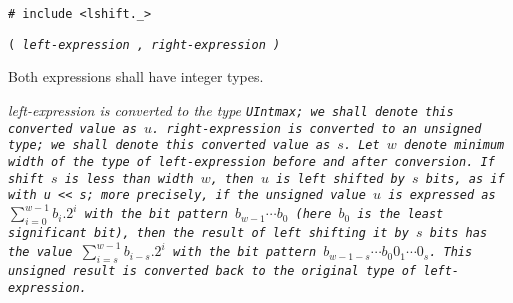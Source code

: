 
\tt{# include <lshift._>}

 \tt{(} \it{left-expression} \tt{,} \it{right-expression} \tt{)}


Both expressions shall have integer types.


\it{left-expression} is converted to the type \tt{UIntmax};
we shall denote this converted value as $u$.
\it{right-expression} is converted to an unsigned type;
we shall denote this converted value as $s$.
Let $w$ denote minimum width of the type of
\it{left-expression} before and after conversion.
If shift $s$ is less than width $w$, then $u$ is left shifted by $s$ bits,
as if with \tt{u << s}; more precisely, if the unsigned value $u$ is expressed
as $\sum_{i = 0}^{w - 1} b_i.2^i$ with the bit pattern $b_{w - 1} \cdots b_0$
(here $b_0$ is the least significant bit), then the result of left shifting
it by $s$ bits has the value $\sum_{i = s}^{w - 1} b_{i - s}.2^i$
with the bit pattern $b_{w - 1 - s} \cdots b_0 0_1 \cdots 0_s$.
This unsigned result is converted back to
the original type of \it{left-expression}.
